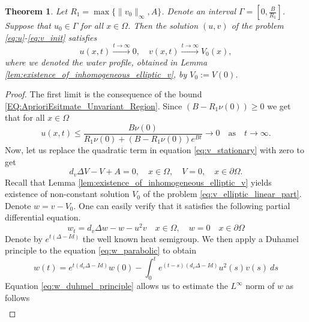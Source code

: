 \documentclass[12pt, a4paper]{article}
\theoremstyle{break}
\newtheorem{thm}{Theorem}[section]
\theoremstyle{break}
\theoremstyle{break}
\theoremstyle{break}
\theoremstyle{break}
\theoremstyle{break}
\theoremstyle{break}
\begin{document}
\begin{thm}
    Let $R_1 = \max\{\|v_0\|_\infty, A\}$. Denote an interval $\Gamma  = \left[0, \frac{B}{R_1}\right]$. Suppose that $u_0 \in \Gamma$ for all $x \in \Omega$. Then the solution $(u, v)$ of the problem \eqref{eq:u}-\eqref{eq:v_init} satisfies
    \begin{equation}
        u(x,t) \xrightarrow{t \rightarrow \infty} 0, \quad v(x,t) \xrightarrow{t \rightarrow \infty} V_0(x),
    \end{equation}
    where we denoted the water profile, obtained in Lemma \ref{lem:existence_of_inhomogeneous_elliptic_v}, by $V_0 := V(0)$.
\end{thm}
\begin{proof}
    The first limit is the consequence of the bound \eqref{EQ:AprioriEsitmate_Unvariant_Region}. Since $(B - R_1\nu(0)) \geq 0$ we get that for all $x \in \Omega$
    \begin{equation*}
        u(x,t) \leq \frac{B\nu(0)}{R_1 \nu(0) + 
        (B - R_1 \nu(0)) e^{B t}} \rightarrow 0 \quad \text{as} \quad t \rightarrow \infty.
    \end{equation*}
    Now, let us replace the quadratic term in equation \eqref{eq:v_stationary} with zero to get
    \begin{equation}
        \label{eq:v_elliptic_linear_part}
        d_v \Delta V - V + A = 0, \quad x \in \Omega, \quad V = 0, \quad x \in \partial \Omega.
    \end{equation}
    Recall that Lemma \ref{lem:existence_of_inhomogeneous_elliptic_v} yields existence of non-constant solution $V_0$ of the problem \eqref{eq:v_elliptic_linear_part}. Denote $w = v - V_0$. One can easily verify that it satisfies the following partial differential equation.
    \begin{equation}
        \label{eq:w_parabolic}
        w_t = d_v\Delta w - w - u^2v \quad x \in \Omega, \quad w = 0 \quad x \in \partial\Omega
    \end{equation}
    Denote by $e^{t(\Delta - Id)}$ the well known heat semigroup. We then apply a Duhamel principle to the equation \eqref{eq:w_parabolic} to obtain
    \begin{equation}
        \label{eq:w_duhmel_principle}
        w(t) = e^{t(d_v\Delta - Id)} w(0) - \int_0^t e^{(t-s)(d_v\Delta - Id)} u^2(s) v(s)\:ds
    \end{equation}
    Equation \eqref{eq:w_duhmel_principle} allows us to estimate the $L^\infty$ norm of $w$ as follows
    \begin{align}

\end{align}
\end{proof}
\end{document}
